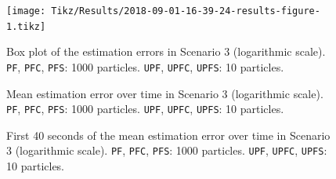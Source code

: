 
\begin{figure}
	\centering
	\setlength\figureheight{0.9\textheight} 	
	\setlength{}		
	\texttt{[image: Tikz/Results/2018-09-01-16-39-24-results-figure-1.tikz]}			
	\caption[Box plot of the estimation errors in Scenario 3. \texttt{PF}, \texttt{PFC}, \texttt{PFS}: 1000 particles. \texttt{UPF}, \texttt{UPFC}, \texttt{UPFS}: 10 particles.]{Box plot of the estimation errors in Scenario 3 (logarithmic scale). \texttt{PF}, \texttt{PFC}, \texttt{PFS}: 1000 particles. \texttt{UPF}, \texttt{UPFC}, \texttt{UPFS}: 10 particles.}
	\label{fig:2018-09-01-16-39-24-results-figure-1}			
\end{figure}

\begin{figure}
	\centering
	\setlength{} 	
	\setlength\figurewidth{0.9\textheight}		
	\caption[Mean estimation error over time in Scenario 3. \texttt{PF}, \texttt{PFC}, \texttt{PFS}: 1000 particles. \texttt{UPF}, \texttt{UPFC}, \texttt{UPFS}: 10 particles.]{Mean estimation error over time in Scenario 3 (logarithmic scale). \texttt{PF}, \texttt{PFC}, \texttt{PFS}: 1000 particles. \texttt{UPF}, \texttt{UPFC}, \texttt{UPFS}: 10 particles.}
	\label{fig:2018-09-01-16-39-24-results-figure-4}			
\end{figure}

\begin{figure}
	\centering
	\setlength{} 	
	\setlength\figurewidth{0.9\textheight}		
	\caption[First 40 seconds of the mean estimation error over time in Scenario 3. \texttt{PF}, \texttt{PFC}, \texttt{PFS}: 1000 particles. \texttt{UPF}, \texttt{UPFC}, \texttt{UPFS}: 10 particles.]{First 40 seconds of the mean estimation error over time in Scenario 3 (logarithmic scale). \texttt{PF}, \texttt{PFC}, \texttt{PFS}: 1000 particles. \texttt{UPF}, \texttt{UPFC}, \texttt{UPFS}: 10 particles.}
	\label{fig:2018-09-01-16-39-24-results-figure-6}			
\end{figure}



